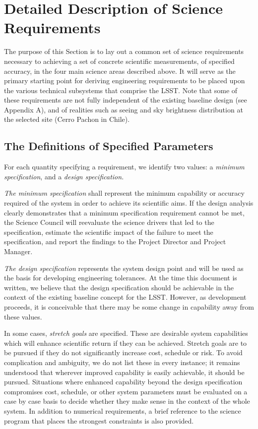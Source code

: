 \section{Detailed Description of Science Requirements }

The purpose of this Section is to lay out a common set of science
requirements necessary to achieving a set of concrete scientific measurements,
of specified accuracy, in the four main science areas described above.  It
will serve as the primary starting point for deriving engineering
requirements to be placed upon the various technical subsystems that
comprise the LSST. Note that some of these requirements are not fully
independent of the existing baseline design (see Appendix A), and of
realities such as seeing and sky brightness distribution at the selected
site (Cerro Pachon in Chile).


\subsection{The Definitions of Specified Parameters }

For each quantity specifying a requirement, we identify two values: a {\it
minimum specification}, and a {\it design specification.}

{\it The minimum specification} shall represent the minimum capability
or accuracy required of the system in order to achieve its scientific
aims. If the design analysis clearly demonstrates that a minimum
specification requirement cannot be met, the Science Council will
reevaluate the science drivers that led to the specification, estimate
the scientific impact of the failure to meet the specification, and
report the findings to the Project Director and Project Manager.

{\it The design specification} represents the system design point and will
be used as the basis for developing engineering tolerances.  At the time
this document is written, we believe that the design specification should
be achievable in the context of the existing baseline concept for the LSST.
However, as development proceeds, it is conceivable that there may be some
change in capability away from these values.

In some cases, {\it stretch goals} are specified. These are desirable
system capabilities which will enhance scientific return if they can be
achieved. Stretch goals are to be pursued if they do not significantly
increase cost, schedule or risk. To avoid complication and ambiguity, we do
not list these in every instance; it remains understood that wherever
improved capability is easily achievable, it should be pursued.  Situations
where enhanced capability beyond the design specification compromises cost,
schedule, or other system parameters must be evaluated on a case by case
basis to decide whether they make sense in the context of the whole system.
In addition to numerical requirements, a brief reference to the science
program that places the strongest constraints is also provided.


